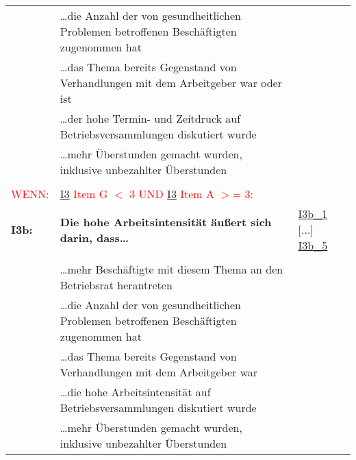 \begin{longtable}{!{\color{black}\vline width 1pt}  L{2cm}!{\color{black}\vline width 1pt} L{12.25cm}!{\color{black}\vline width 1pt}  L{2.5cm}!{\color{black}\vline width 1pt}}
   & …die Anzahl der von gesundheitlichen Problemen betroffenen Beschäftigten zugenommen hat &  \\ 
   & …das Thema bereits Gegenstand von Verhandlungen mit dem Arbeitgeber war oder ist &  \\ 
   & …der hohe Termin- und Zeitdruck auf Betriebsversammlungen diskutiert wurde &  \\ 
   & …mehr Überstunden gemacht wurden, inklusive unbezahlter Überstunden &  \\ 
   &  &  \\ 
   \midrule
{}\textcolor{red}{WENN:} & \textcolor{red}{ \hyperref[I3]{I3} Item G $<$ 3 UND  \hyperref[I3]{I3} Item A $>$= 3:} &  \\ 
  \textbf{I3b:}\label{I3b} & \textbf{Die hohe Arbeitsintensität äußert sich darin, dass…} & \hyperref[var:I3b:1]{I3b\_1} [...] \hyperref[var:I3b:5]{I3b\_5} \\ 
   &  &  \\ 
   & …mehr Beschäftigte mit diesem Thema an den Betriebsrat herantreten &  \\ 
   & …die Anzahl der von gesundheitlichen Problemen betroffenen Beschäftigten zugenommen hat &  \\ 
   & …das Thema bereits Gegenstand von Verhandlungen mit dem Arbeitgeber war &  \\ 
   & …die hohe Arbeitsintensität auf Betriebsversammlungen diskutiert wurde &  \\ 
   & …mehr Überstunden gemacht wurden, inklusive unbezahlter Überstunden &  \\ 

\end{longtable}
